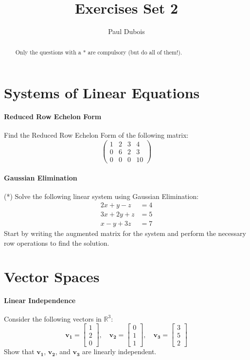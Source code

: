 \documentclass[]{article}
\title{Exercises Set 2}
\author{Paul Dubois}
\begin{document}
	
	\maketitle
	
	\begin{abstract}
		Only the questions with a * are compulsory (but do all of them!).
	\end{abstract}
	
	\section{Systems of Linear Equations}
	\paragraph{Reduced Row Echelon Form}
	Find the Reduced Row Echelon Form of the following matrix:
	$$\begin{pmatrix}
		1 & 2 & 3 & 4\\
		0 & 6 & 2 & 3\\
		0 & 0 & 0 & 10
	\end{pmatrix}$$
	
	\paragraph{Gaussian Elimination}
	(*) Solve the following linear system using Gaussian Elimination:
	\begin{align*}
		2x + y - z &= 4 \\
		3x + 2y + z &= 5 \\
		x - y + 3z &= 7
	\end{align*}
	Start by writing the augmented matrix for the system and perform the necessary row operations to find the solution.
	
	
	\section{Vector Spaces}
	\paragraph{Linear Independence}
	Consider the following vectors in $\mathbb{R}^3$:
	$$
	\mathbf{v_1} = \begin{bmatrix}
		1 \\
		2 \\
		0
	\end{bmatrix}, \quad
	\mathbf{v_2} = \begin{bmatrix}
		0 \\
		1 \\
		1
	\end{bmatrix}, \quad
	\mathbf{v_3} = \begin{bmatrix}
		3 \\
		5 \\
		2
	\end{bmatrix}
	$$
	Show that $\mathbf{v_1}$, $\mathbf{v_2}$, and $\mathbf{v_3}$ are linearly independent.
	
\end{document}
